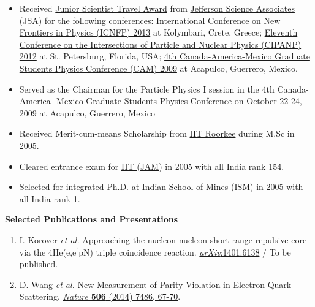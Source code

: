 \begin{singlespace}
\begin{changemargin}{-12pt}{0in}
\begin{itemize}
	\item Received \href{http://www.jsallc.org/IF/IndexJSTF.html}{Junior Scientist Travel Award} from \href{http://www.jsallc.org/index.html}{Jefferson Science Associates (JSA)} for the following conferences: 
\href{http://indico.cern.ch/conferenceDisplay.py?confId=198153}{International Conference on New Frontiers in Physics (ICNFP) 2013} at  Kolymbari, Crete, Greece;
	\href{http://cipanp2012.triumf.ca/}{Eleventh Conference on the Intersections of Particle and Nuclear Physics (CIPANP) 2012} at St. Petersburg, Florida, USA;
	\href{http://cam2009.smf.mx/}{4th Canada-America-Mexico Graduate Students Physics Conference (CAM) 2009} at Acapulco, Guerrero, Mexico.	

	\item Served as the Chairman for the Particle Physics I session in the 4th Canada- America- Mexico Graduate Students Physics Conference on October 22-24, 2009 at Acapulco, Guerrero, Mexico	
	\item Received Merit-cum-means Scholarship from \href{http://www.iitr.ac.in/}{IIT Roorkee} during M.Sc in 2005.
	\item Cleared entrance exam for  \href{http://gate.iitk.ac.in/jam/}{IIT (JAM)} in 2005 with all India rank 154.
	\item Selected for integrated Ph.D. at \href{http://www.ismdhanbad.ac.in/}{Indian School of Mines (ISM)} in 2005 with all India rank 1.

\end{itemize}
\end{changemargin}




\begin{center}
\large{\textbf{Selected Publications and Presentations}}
\end{center}
\vspace{-12pt}

\begin{changemargin}{-10pt}{0in} 
\begin{enumerate} 
\setlength{\itemsep}{-1pt}

	\item I. Korover \textit{et al.} 
	Approaching the nucleon-nucleon short-range repulsive core via the 4He(e,e$^{'}$pN) triple coincidence reaction.
	\href{http://arxiv.org/abs/1401.6138}{\textit{arXiv}:1401.6138}  / To be published.

	\item D. Wang \textit{et al.} 
	New Measurement of Parity Violation in Electron-Quark Scattering.
	\href{http://www.nature.com/nature/journal/v506/n7486/full/nature12964.html}{\textit{Nature} \textbf{506} (2014) 7486, 67-70}.


\end{enumerate}
\end{changemargin}
\end{singlespace}
